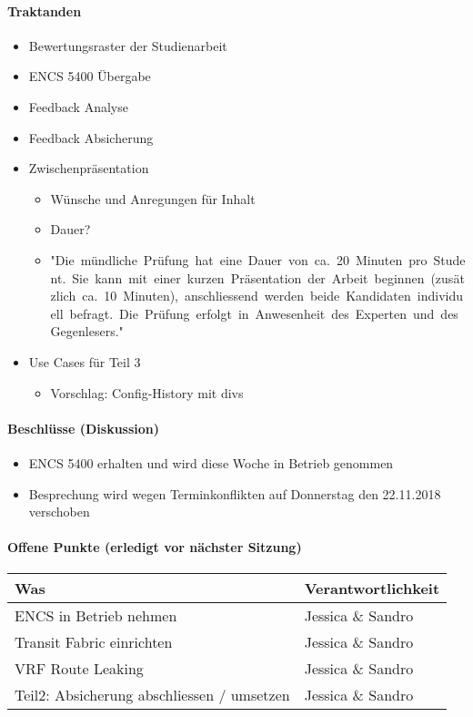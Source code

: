 \paragraph{Traktanden}
\begin{itemize}	
	\item Bewertungsraster der Studienarbeit
	\item ENCS 5400 Übergabe
	\item Feedback Analyse
	\item Feedback Absicherung
	\item Zwischenpräsentation 
	\begin{itemize}
		\item Wünsche und Anregungen für Inhalt
		\item Dauer?
		\item "Die mündliche Prüfung hat eine Dauer von ca. 20 Minuten pro Student. Sie kann mit einer kurzen Präsentation der Arbeit beginnen (zusätzlich ca. 10 Minuten), anschliessend werden beide Kandidaten individuell befragt. Die Prüfung erfolgt in Anwesenheit des Experten und des Gegenlesers."
	\end{itemize}
	\item Use Cases für Teil 3
	\begin{itemize}
		\item Vorschlag: Config-History mit divs
	\end{itemize}
\end{itemize}

\paragraph{Beschlüsse (Diskussion)}
\begin{itemize}	
	\item ENCS 5400 erhalten und wird diese Woche in Betrieb genommen
	\item Besprechung wird wegen Terminkonflikten auf Donnerstag den 22.11.2018 verschoben
\end{itemize}

\paragraph{Offene Punkte (erledigt vor nächster Sitzung)} \mbox{}
\begin{table}[H]
	\centering
	\begin{tabularx}{\textwidth}{X | p{4.5cm}}
		\rowcolor{gray!50}
		\textbf{Was} & \textbf{Verantwortlichkeit} \\
		\hline
		ENCS in Betrieb nehmen & Jessica \& Sandro \\	
		Transit Fabric einrichten & Jessica \& Sandro  \\
		VRF Route Leaking & Jessica \& Sandro \\
		Teil2: Absicherung abschliessen / umsetzen & Jessica \& Sandro \\
	\end{tabularx}
	\label{tab:my-label}
\end{table}

